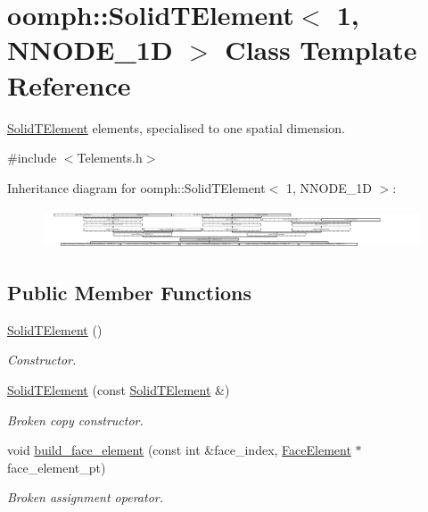 \hypertarget{classoomph_1_1SolidTElement_3_011_00_01NNODE__1D_01_4}{}\section{oomph\+:\+:Solid\+T\+Element$<$ 1, N\+N\+O\+D\+E\+\_\+1D $>$ Class Template Reference}
\label{classoomph_1_1SolidTElement_3_011_00_01NNODE__1D_01_4}


\hyperlink{classoomph_1_1SolidTElement}{Solid\+T\+Element} elements, specialised to one spatial dimension.  




{\ttfamily \#include $<$Telements.\+h$>$}

Inheritance diagram for oomph\+:\+:Solid\+T\+Element$<$ 1, N\+N\+O\+D\+E\+\_\+1D $>$\+:\begin{figure}[H]
\begin{center}
\leavevmode
\includegraphics[height=1.183575cm]{classoomph_1_1SolidTElement_3_011_00_01NNODE__1D_01_4}
\end{center}
\end{figure}
\subsection*{Public Member Functions}
\begin{DoxyCompactItemize}
\item 
\hyperlink{classoomph_1_1SolidTElement_3_011_00_01NNODE__1D_01_4_ae89f5eb35a83d760288e9ec596977e75}{Solid\+T\+Element} ()
\begin{DoxyCompactList}\small\item\em Constructor. \end{DoxyCompactList}\item 
\hyperlink{classoomph_1_1SolidTElement_3_011_00_01NNODE__1D_01_4_a8579d6917b2db677180f0dc2e7d7ed67}{Solid\+T\+Element} (const \hyperlink{classoomph_1_1SolidTElement}{Solid\+T\+Element} \&)
\begin{DoxyCompactList}\small\item\em Broken copy constructor. \end{DoxyCompactList}\item 
void \hyperlink{classoomph_1_1SolidTElement_3_011_00_01NNODE__1D_01_4_af28faf30149cf74367333bcad014625a}{build\+\_\+face\+\_\+element} (const int \&face\+\_\+index, \hyperlink{classoomph_1_1FaceElement}{Face\+Element} $\ast$face\+\_\+element\+\_\+pt)
\begin{DoxyCompactList}\small\item\em Broken assignment operator. \end{DoxyCompactList}\end{DoxyCompactItemize}
